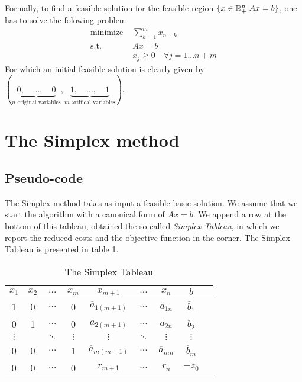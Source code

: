 Formally, to find a feasible solution for the feasible region  $\{ x\in\mathbb R^n_+ | Ax = b \}$, one has to solve the folowing problem 
\begin{align*}
    \textrm{minimize } & \sum_{k=1}^m x_{n+k}\\
    \textrm{s.t. } & Ax = b\\
    & x_j \ge 0\quad\forall j=1...n+m
\end{align*}
For which an initial feasible solution is clearly given by $(\underbrace{0,\quad...,\quad0}_{n\textrm{ original variables}},\underbrace{1,\quad...,\quad1}_{m\textrm{ artifical variables}})$. 

\section{The Simplex method}

\subsection{Pseudo-code}

The Simplex method takes as input a feasible basic solution. We assume that we start the algorithm with a canonical form of $Ax = b$. We append a row at the bottom of this tableau, obtained the so-called \textit{Simplex Tableau}, in which we report the reduced costs and the objective function in the corner. The Simplex Tableau is presented in table \ref{tab:simplex}. 
\begin{table}[h!]
    \centering
    \begin{tabular}{ccccccc|cc}
        \hline
        $x_1$ & $x_2$ & $...$ & $x_m$ & $x_{m+1}$ & $...$ & $x_n$ & $b$ \\\hline
        1 & 0 & $...$ & 0 & $\overline a_{1(m+1)}$ & $...$ & $\overline a_{1n}$ & $\overline b_1$\\
        0 & 1 & $...$ & 0 & $\overline a_{2(m+1)}$ & $...$ & $\overline a_{2n}$ & $\overline b_2$\\
        $\vdots$ &  & $\ddots$ & $\vdots$ & $\vdots$ & $\ddots$ & $\vdots$ & $\vdots$  \\
        0 & 0 & $...$ & 1 & $\overline a_{m(m+1)}$ & $...$ & $\overline a_{mn}$ & $\overline b_m$\\\hline
        0 & 0 & $...$ & 0 & $r_{m+1}$ & $...$ & $r_n$ & $-z_0$
    \end{tabular}
    \caption{The Simplex Tableau}
    \label{tab:simplex}
\end{table}

